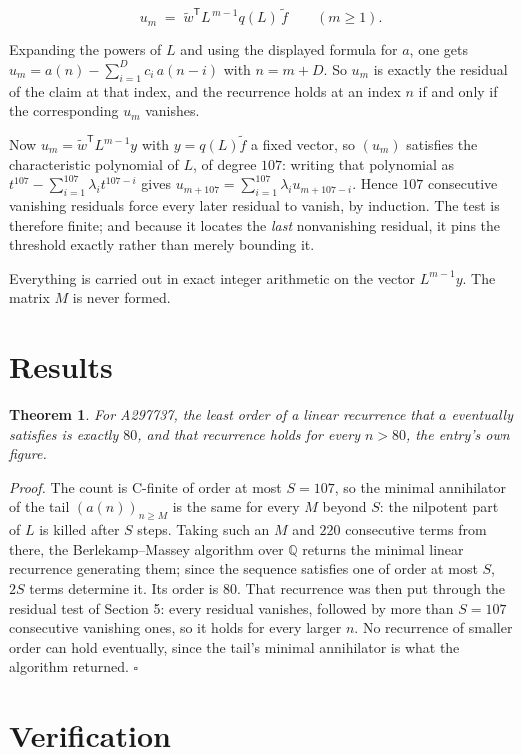 \documentclass[11pt]{article}
\newtheorem{theorem}{Theorem}
\theoremstyle{definition}
\begin{document}
\[u_m \;=\; \tilde w^{\mathsf T} L^{\,m-1} q(L)\,\tilde f \qquad (m \ge 1).\]

Expanding the powers of $L$ and using the displayed formula for $a$, one gets $u_m = a(n) - \sum_{i=1}^{D} c_i\,a(n-i)$ with $n = m + D$. So $u_m$ is exactly the residual of the claim at that index, and the recurrence holds at an index $n$ if and only if the corresponding $u_m$ vanishes.

Now $u_m = \tilde w^{\mathsf T} L^{m-1} y$ with $y = q(L)\tilde f$ a fixed vector, so $(u_m)$ satisfies the characteristic polynomial of $L$, of degree $107$: writing that polynomial as $t^{107} - \sum_{i=1}^{107} \lambda_i t^{107-i}$ gives $u_{m+107} = \sum_{i=1}^{107} \lambda_i u_{m+107-i}$. Hence $107$ consecutive vanishing residuals force every later residual to vanish, by induction. The test is therefore finite; and because it locates the {\itshape last} nonvanishing residual, it pins the threshold exactly rather than merely bounding it.

Everything is carried out in exact integer arithmetic on the vector $L^{m-1}y$. The matrix $M$ is never formed.

\section{Results}

\begin{theorem} For A297737, the least order of a linear recurrence that $a$ eventually satisfies is exactly $80$, and that recurrence holds for every $n > 80$, the entry's own figure.\end{theorem}

{\itshape Proof.} The count is C-finite of order at most $S = 107$, so the minimal annihilator of the tail $(a(n))_{n \ge M}$ is the same for every $M$ beyond $S$: the nilpotent part of $L$ is killed after $S$ steps. Taking such an $M$ and $220$ consecutive terms from there, the Berlekamp--Massey algorithm over $\mathbb{Q}$ returns the minimal linear recurrence generating them; since the sequence satisfies one of order at most $S$, $2S$ terms determine it. Its order is $80$. That recurrence was then put through the residual test of Section 5: every residual vanishes, followed by more than $S = 107$ consecutive vanishing ones, so it holds for every larger $n$. No recurrence of smaller order can hold eventually, since the tail's minimal annihilator is what the algorithm returned. $\square$

\section{Verification}
\end{document}
